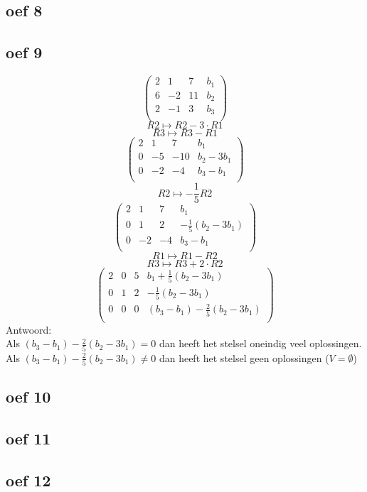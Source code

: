 \documentclass[10pt,a4paper]{article}
\begin{document}
\subsection*{oef 8}

\subsection*{oef 9}
\[
\begin{pmatrix}
2 &  1 &  7 & b_1\\
6 & -2 & 11 & b_2 \\
2 & -1 &  3 & b_3\\
\end{pmatrix}
\]
\[ R2 \longmapsto R2 -3\cdot R1\]
\[ R3 \longmapsto R3 - R1\]
\[
\begin{pmatrix}
2 &  1 &  7 & b_1\\
0 & -5 & -10& b_2-3b_1 \\
0 & -2 &  -4& b_3-b_1\\
\end{pmatrix}
\]
\[ R2 \longmapsto -\frac{1}{5} R2\]
\[
\begin{pmatrix}
2 &  1 &  7 & b_1\\
0 &  1 &  2 & -\frac{1}{5}(b_2-3b_1) \\
0 & -2 &  -4& b_3-b_1\\
\end{pmatrix}
\]
\[ R1 \longmapsto R1 - R2\]
\[ R3 \longmapsto R3 + 2 \cdot	R2\]
\[
\begin{pmatrix}
2 &  0 &  5 & b_1 + \frac{1}{5}(b_2-3b_1)\\
0 &  1 &  2 & -\frac{1}{5}(b_2-3b_1) \\
0 &  0 &  0 & (b_3-b_1) - \frac{2}{5}(b_2-3b_1)\\
\end{pmatrix}
\]
Antwoord:\\
Als $(b_3-b_1) - \frac{2}{5}(b_2-3b_1) = 0$ dan heeft het stelsel oneindig veel oplossingen.
Als $(b_3-b_1) - \frac{2}{5}(b_2-3b_1) \neq 0$ dan heeft het stelsel geen oplossingen ($V=\emptyset$)

\subsection*{oef 10}

\subsection*{oef 11}

\subsection*{oef 12}
\end{document}
